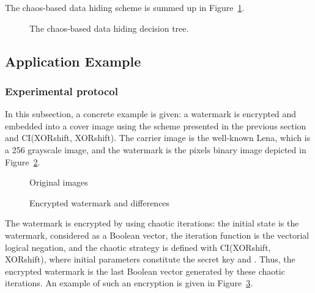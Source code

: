 \documentclass[journal]{IEEEtran}
\begin{document}
The chaos-based data hiding scheme is summed up in Figure~\ref{fig:organigramme}.

\begin{figure}[htb]
\centerline{}
\caption{The chaos-based data hiding decision tree.}
\label{fig:organigramme}
\end{figure}




\subsection{Application Example}

\subsubsection{Experimental protocol}


In this subsection, a concrete example is given: a watermark is encrypted and embedded into a cover image using the scheme presented in the previous section and CI(XORshift, XORshift). The carrier image is the well-known Lena, which is a 256 grayscale image, and the watermark is the  pixels binary image depicted in Figure~\ref{Original images}.


\begin{figure}[!t]
\centering
{}
\hfil
{}
\caption{Original images}
\label{Original images}
\end{figure}


\begin{figure}[!t]
\centering
{}
\hfil
{}
\caption{Encrypted watermark and differences}
\label{Encrypted watermark and differences}
\end{figure}

The watermark is encrypted by using chaotic iterations: the initial state  is the watermark, considered as a Boolean vector, the iteration function is the vectorial logical negation, and the chaotic strategy  is defined with CI(XORshift, XORshift), where initial parameters constitute the secret key and . Thus, the encrypted watermark is the last Boolean vector generated by these chaotic iterations. An example of such an encryption is given in Figure~\ref{Encrypted watermark and differences}.
\end{document}
